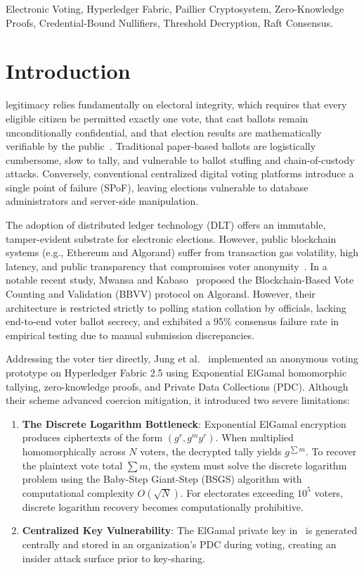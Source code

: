 \documentclass[journal,10pt,twocolumn]{IEEEtran}
\begin{document}
\begin{IEEEkeywords}
Electronic Voting, Hyperledger Fabric, Paillier Cryptosystem, Zero-Knowledge Proofs, Credential-Bound Nullifiers, Threshold Decryption, Raft Consensus.
\end{IEEEkeywords}

\section{Introduction}
 legitimacy relies fundamentally on electoral integrity, which requires that every eligible citizen be permitted exactly one vote, that cast ballots remain unconditionally confidential, and that election results are mathematically verifiable by the public~\cite{chaum1983blind,paillier1999public}. Traditional paper-based ballots are logistically cumbersome, slow to tally, and vulnerable to ballot stuffing and chain-of-custody attacks. Conversely, conventional centralized digital voting platforms introduce a single point of failure (SPoF), leaving elections vulnerable to database administrators and server-side manipulation.

The adoption of distributed ledger technology (DLT) offers an immutable, tamper-evident substrate for electronic elections. However, public blockchain systems (e.g., Ethereum and Algorand) suffer from transaction gas volatility, high latency, and public transparency that compromises voter anonymity~\cite{mwansa2024improving,alshehri2023privacy}. In a notable recent study, Mwansa and Kabaso~\cite{mwansa2024improving} proposed the Blockchain-Based Vote Counting and Validation (BBVV) protocol on Algorand. However, their architecture is restricted strictly to polling station collation by officials, lacking end-to-end voter ballot secrecy, and exhibited a 95\% consensus failure rate in empirical testing due to manual submission discrepancies.

Addressing the voter tier directly, Jung et al.~\cite{jung2026anonymous} implemented an anonymous voting prototype on Hyperledger Fabric 2.5 using Exponential ElGamal homomorphic tallying, zero-knowledge proofs, and Private Data Collections (PDC). Although their scheme advanced coercion mitigation, it introduced two severe limitations:
\begin{enumerate}
    \item \textbf{The Discrete Logarithm Bottleneck}: Exponential ElGamal encryption produces ciphertexts of the form $(g^r, g^m y^r)$. When multiplied homomorphically across $N$ voters, the decrypted tally yields $g^{\sum m}$. To recover the plaintext vote total $\sum m$, the system must solve the discrete logarithm problem using the Baby-Step Giant-Step (BSGS) algorithm with computational complexity $O(\sqrt{N})$. For electorates exceeding $10^5$ voters, discrete logarithm recovery becomes computationally prohibitive.
    \item \textbf{Centralized Key Vulnerability}: The ElGamal private key in~\cite{jung2026anonymous} is generated centrally and stored in an organization's PDC during voting, creating an insider attack surface prior to key-sharing.
\end{enumerate}
\end{document}
